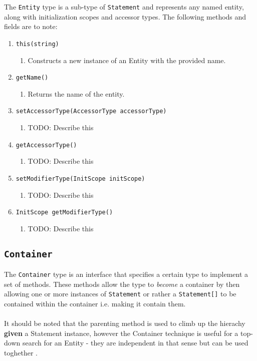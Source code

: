 The \texttt{Entity} type is a sub-type of \texttt{Statement} and
represents any named entity, along with initialization scopes  and
accessor types. The following methods and fields are to note:
\begin{enumerate}
\item \texttt{this(string)}
\begin{enumerate}
\item Constructs a new instance of an Entity with the provided name.
\end{enumerate}
\item \texttt{getName()}
\begin{enumerate}
\item Returns the name of the entity.
\end{enumerate}
\item \texttt{setAccessorType(AccessorType accessorType)}
\begin{enumerate}
\item TODO: Describe this
\end{enumerate}
\item \texttt{getAccessorType()}
\begin{enumerate}
\item TODO: Describe this
\end{enumerate}
\item \texttt{setModifierType(InitScope initScope)}
\begin{enumerate}
\item TODO: Describe this
\end{enumerate}
\item \texttt{InitScope getModifierType()}
\begin{enumerate}
\item TODO: Describe this
\end{enumerate}
\end{enumerate}

\subsection{\texttt{Container}}

The \texttt{Container} type is an interface that specifies a certain
type to implement a set of methods. These methods allow the type to
\emph{become} a container by then allowing one or more instances of
\texttt{Statement} or rather a \texttt{Statement[]} to be contained
within the container i.e. making it contain them.\\
\\
It should be noted that the parenting method is used to climb up the
hierachy \textbf{given} a Statement instance, however the Container
technique is useful for a top-down search for an Entity - they are
independent in that sense but can be used toghether .

